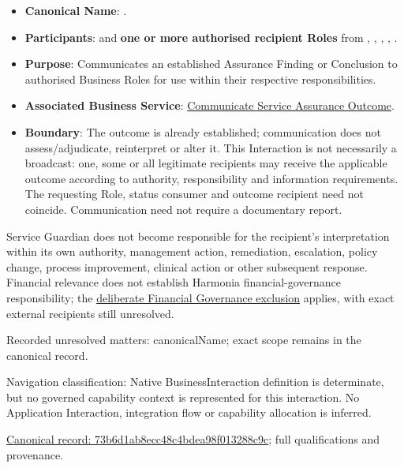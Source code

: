\begin{itemize}


\item \textbf{Canonical Name}: \texttt{}.

\item \textbf{Participants}: \texttt{} and \textbf{one or more authorised recipient Roles} from \texttt{}, \texttt{}, \texttt{}, \texttt{}, \texttt{}.

\item \textbf{Purpose}: Communicates an established Assurance Finding or Conclusion to authorised Business Roles for use within their respective responsibilities.

\item \textbf{Associated Business Service}: \href{\detokenize{../../../../../../../../docs/markdown/03-business-architecture/behaviours/health-service-assurance.md#communicate-service-assurance-outcome}}{Communicate Service Assurance Outcome}.

\item \textbf{Boundary}: The outcome is already established; communication does not assess/adjudicate, reinterpret or alter it. This Interaction is not necessarily a broadcast: one, some or all legitimate recipients may receive the applicable outcome according to authority, responsibility and information requirements. The requesting Role, status consumer and outcome recipient need not coincide. Communication need not require a documentary report.

\end{itemize}


Service Guardian does not become responsible for the recipient's interpretation within its own authority, management action, remediation, escalation, policy change, process improvement, clinical action or other subsequent response. Financial relevance does not establish Harmonia financial-governance responsibility; the \href{\detokenize{../../../../../../../../docs/markdown/03-business-architecture/behaviours/health-service-assurance.md#financial-governance-exclusion}}{deliberate Financial Governance exclusion} applies, with exact external recipients still unresolved.


{\small Recorded unresolved matters: canonicalName; exact scope remains in the canonical record.}\par
{\small Navigation classification: Native BusinessInteraction definition is determinate, but no governed capability context is represented for this interaction. No Application Interaction, integration flow or capability allocation is inferred.}\par
{\footnotesize \href{../../../../../../../continuum/business/business-interaction/73b6d1ab8ecc48c4bdea98f013288c9c.md}{Canonical record: 73b6d1ab8ecc48c4bdea98f013288c9c}; full qualifications and provenance.}\par
